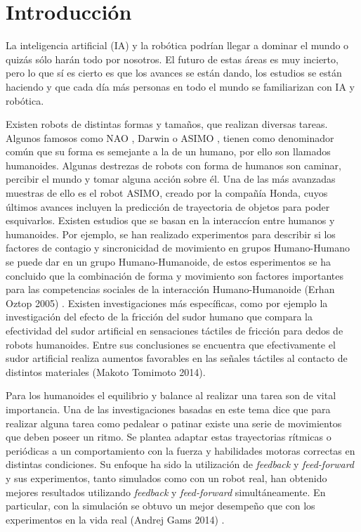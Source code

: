 
\chapter{Introducción}\label{intro}


\label{sect:justificacion}

La inteligencia artificial (IA) y la rob\'otica podr\'ian llegar a dominar el mundo o quiz\'as s\'olo har\'an todo por nosotros. El futuro de estas \'areas es muy incierto, pero lo que sí es cierto es que los avances se est\'an dando, los estudios se est\'an haciendo y que cada d\'ia m\'as personas en todo el mundo se familiarizan con IA y rob\'otica.

Existen robots de distintas formas y tama\~nos, que realizan diversas tareas. Algunos famosos como NAO \cite{nao}, Darwin \cite{darwin} o ASIMO \cite{asimo}, tienen como denominador com\'un que su forma es semejante a la de un humano, por ello son llamados humanoides. Algunas destrezas de robots con forma de humanos son caminar, percibir el mundo y tomar alguna acción sobre él. Una de las más avanzadas muestras de ello es el robot ASIMO, creado por la compañía Honda, cuyos últimos avances incluyen la predicción de trayectoria de objetos para poder esquivarlos. Existen estudios que se basan en la interacc\'ion entre humanos y humanoides. Por ejemplo, se han realizado experimentos para describir si los factores de contagio y sincronicidad de movimiento en grupos Humano-Humano se puede dar en un grupo Humano-Humanoide, de estos esperimentos se ha concluido que la combinaci\'on de forma y movimiento son factores importantes para las competencias sociales de la interacci\'on Humano-Humanoide (Erhan Oztop 2005) \cite{interacion}. 
Existen investigaciones más espec\'ificas, como por ejemplo la investigación del efecto de la fricci\'on del sudor humano que compara la efectividad del sudor artificial en sensaciones t\'actiles de fricci\'on para dedos de robots humanoides. Entre sus conclusiones se encuentra que efectivamente el sudor artificial realiza aumentos favorables en las se\~nales t\'actiles al contacto de distintos materiales (Makoto Tomimoto 2014)\cite{sudor}.

Para los humanoides el equilibrio y balance al realizar una tarea son de vital importancia. Una de las investigaciones basadas en este tema dice que para realizar alguna tarea como pedalear o patinar existe una serie de movimientos que deben poseer un ritmo. Se plantea adaptar estas trayectorias r\'itmicas o peri\'odicas a un comportamiento con la fuerza y habilidades motoras correctas en distintas condiciones. Su enfoque ha sido la utilizaci\'on de \textit{feedback} y \textit{feed-forward} y sus experimentos, tanto simulados como con un robot real, han obtenido mejores resultados utilizando \textit{feedback} y \textit{feed-forward} simult\'aneamente. En particular, con la simulaci\'on se obtuvo un mejor desempe\~no que con los experimentos en la vida real (Andrej Gams 2014) \cite{pedal}.

